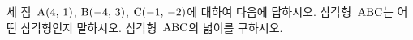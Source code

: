 세 점~$\mathrm{A}(4,\mkern3mu 1)$, $\mathrm{B}(-4,\mkern3mu 3)$, $\mathrm{C}(-1,\mkern3mu -2)$에 대하여 다음에 답하시오.
 삼각형~$\mathrm{ABC}$는 어떤 삼각형인지 말하시오.
 삼각형~$\mathrm{ABC}$의 넓이를 구하시오.
